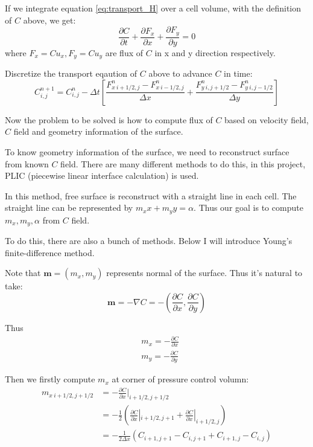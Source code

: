 \documentclass[11pt]{article}
\begin{document}
If we integrate equation \ref{eq:transport_H} over a cell volume, with the definition of $C$ above, we get:
\begin{equation}
    \frac{\partial C}{\partial t} + \frac{\partial F_x}{\partial x} +\frac{\partial F_y}{\partial y} = 0
    \label{}
\end{equation}
where $F_x = Cu_x, F_y = Cu_y$ are flux of $C$ in x and y direction respectively.

Discretize the transport eqaution of $C$ above to advance $C$ in time:
\begin{equation}
    C^{n+1}_{i,j} = C^{n}_{i,j} - \Delta t [\frac{F_{x\ i+1/2,j}^{n} - F_{x \ i-1/2,j}^{n}}{\Delta x} + \frac{F_{y \ i,j+1/2}^{n}-F_{y\ i,j-1/2}^{n}}{\Delta y}]
    \label{}
\end{equation}

Now the problem to be solved is how to compute flux of $C$ based on velocity field, $C$ field and geometry information of the surface.
\par
To know geometry information of the surface, we need to reconstruct surface from known $C$ field. There are many different methods to do this, in this project, PLIC (piecewise linear interface calculation) is used.

\par
In this method, free surface is reconstruct with a straight line in each cell. 
The straight line can be represented by $m_{x} x + m_{y} y =  \alpha$. 
Thus our goal is to compute $m_{x},m_{y},\alpha$ from $C$ field.

To do this, there are also a bunch of methods. 
Below I will introduce Young's finite-difference method.


Note that $\bm{m} = (m_x,m_y)$ represents normal of the surface. Thus it's natural to take:
\begin{equation}
    \bm{m} = - \nabla C  = - ( \frac{\partial C}{\partial x}, \frac{\partial C}{\partial y})
    \label{}
\end{equation}

Thus 
\begin{align}
        &m_x = -\frac{\partial C}{\partial x} \\
        &m_y = -\frac{\partial C}{\partial y}
\end{align}

Then we firstly compute $m_x$ at corner of pressure control volumn:
\begin{align}
    m_{x\ i+1/2,j+1/2} &= - \frac{\partial C}{\partial x}|_{i+1/2,j+1/2}\\
    & = - \frac{1}{2} ( \frac{\partial C}{\partial x}|_{i+1/2,j+1} +\frac{\partial C}{\partial x}|_{i+1/2,j}) \\
    & = - \frac{1}{2 \Delta x} ( C_{i+1,j+1} -C_{i,j+1} + C_{i+1,j} - C_{i,j} )  
    \label{}
\end{align}
\end{document}
